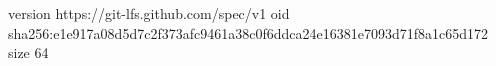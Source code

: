 version https://git-lfs.github.com/spec/v1
oid sha256:e1e917a08d5d7c2f373afc9461a38c0f6ddca24e16381e7093d71f8a1c65d172
size 64
